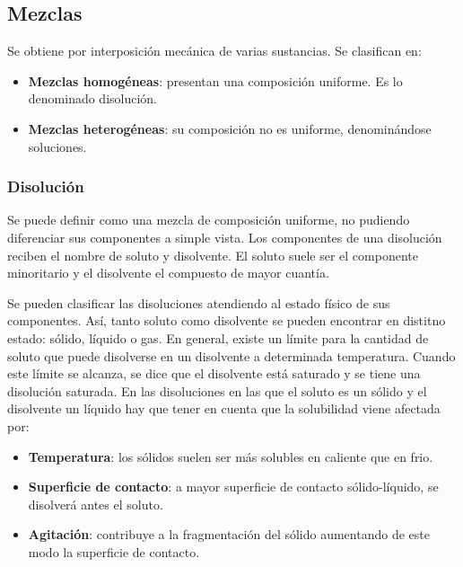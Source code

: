 \subsection{Mezclas}
Se obtiene por interposición mecánica de varias sustancias. Se clasifican en:
\begin{itemize}[itemsep=0pt,parsep=0pt,topsep=0pt,partopsep=0pt]
    \item \textbf{Mezclas homogéneas}: presentan una composición uniforme. Es lo denominado disolución.
    \item\textbf{Mezclas heterogéneas}: su composición no es uniforme, denominándose soluciones.
\end{itemize}
\subsubsection{Disolución}
Se puede definir como una mezcla de composición uniforme, no pudiendo diferenciar sus componentes a simple vista. Los componentes de una disolución reciben el nombre de soluto y disolvente. El soluto suele ser el componente minoritario y el disolvente el compuesto de mayor cuantía.

Se pueden clasificar las disoluciones atendiendo al estado físico de sus componentes. Así, tanto soluto como disolvente se pueden encontrar en distitno estado: sólido, líquido o gas. En general, existe un límite para la cantidad de soluto que puede disolverse en un disolvente a determinada temperatura. Cuando este límite se alcanza, se dice que el disolvente está saturado y se tiene una disolución saturada. En las disoluciones en las que el soluto es un sólido y el disolvente un líquido hay que tener en cuenta que la solubilidad viene afectada por:
\begin{itemize}[itemsep=0pt,parsep=0pt,topsep=0pt,partopsep=0pt]
    \item \textbf{Temperatura}: los sólidos suelen ser más solubles en caliente que en frio.
    \item\textbf{Superficie de contacto}: a mayor superficie de contacto sólido-líquido, se disolverá antes el soluto.
    \item\textbf{Agitación}: contribuye a la fragmentación del sólido aumentando de este modo la superficie de contacto.
\end{itemize}